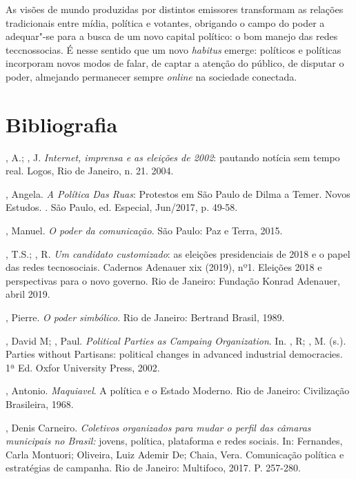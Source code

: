 As visões de mundo produzidas por distintos emissores transformam as
relações tradicionais entre mídia, política e votantes, obrigando o
campo do poder a adequar"-se para a busca de um novo capital político: o
bom manejo das redes teccnossocias. É nesse sentido que um novo
\emph{habitus} emerge: políticos e políticas incorporam novos modos de
falar, de captar a atenção do público, de disputar o poder, almejando
permanecer sempre \emph{online} na sociedade conectada.

\section{Bibliografia}

\begin{Parskip}
, A.; , J. \emph{Internet, imprensa e as eleições de 2002}:
pautando notícia sem tempo real. Logos, Rio de Janeiro, n. 21. 2004.

, Angela. \emph{A Política Das Ruas}: Protestos em São Paulo de
Dilma a Temer. Novos Estudos. . São Paulo, ed. Especial, Jun/2017,
p. 49-58.

, Manuel. \emph{O poder da comunicação}. São Paulo: Paz e
Terra, 2015.

, T.S.; , R. \emph{Um candidato customizado}: as
eleições presidenciais de 2018 e o papel das redes tecnosociais.
Cadernos Adenauer xix (2019), nº1. Eleições 2018 e perspectivas para o
novo governo. Rio de Janeiro: Fundação Konrad Adenauer, abril 2019.

, Pierre. \emph{O poder simbólico}. Rio de Janeiro: Bertrand
Brasil, 1989.

, David M; , Paul. \emph{Political Parties as Campaing
Organization}. In. , R; , M. (s.). Parties without
Partisans: political changes in advanced industrial democracies. 1ª Ed.
Oxfor University Press, 2002.

, Antonio. \emph{Maquiavel}. A política e o Estado Moderno. Rio
de Janeiro: Civilização Brasileira, 1968.

, Denis Carneiro. \emph{Coletivos organizados para mudar o perfil
das câmaras municipais no Brasil:} jovens, política, plataforma e redes
sociais. In: Fernandes, Carla Montuori; Oliveira, Luiz Ademir De; Chaia,
Vera. Comunicação política e estratégias de campanha. Rio de Janeiro:
Multifoco, 2017. P. 257-280.


\end{Parskip}
